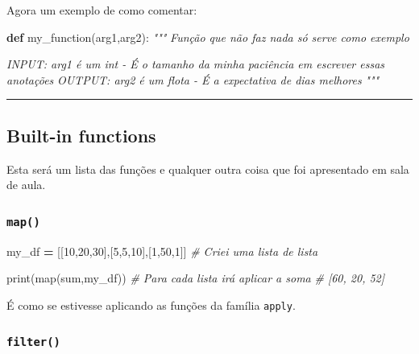 \documentclass[]{book}
\newenvironment{Shaded}{\begin{snugshade}}{\end{snugshade}}
\newcommand{\KeywordTok}[1]{\textcolor[rgb]{0.13,0.29,0.53}{\textbf{#1}}}
\newcommand{\DecValTok}[1]{\textcolor[rgb]{0.00,0.00,0.81}{#1}}
\newcommand{\CommentTok}[1]{\textcolor[rgb]{0.56,0.35,0.01}{\textit{#1}}}
\newcommand{\OperatorTok}[1]{\textcolor[rgb]{0.81,0.36,0.00}{\textbf{#1}}}
\newcommand{\BuiltInTok}[1]{#1}
\newcommand{\NormalTok}[1]{#1}
\begin{document}
Agora um exemplo de como comentar:

\begin{Shaded}
\begin{Highlighting}[]
\KeywordTok{def}\NormalTok{ my_function(arg1,arg2):}
    \CommentTok{"""}
\CommentTok{    Função que não faz nada só serve como exemplo}

\CommentTok{    INPUT: arg1 é um int - É o tamanho da minha paciência em escrever essas anotações}
\CommentTok{    OUTPUT: arg2 é um flota - É a expectativa de dias melhores}
\CommentTok{    """}
\end{Highlighting}
\end{Shaded}

\begin{center}\rule{0.5\linewidth}{\linethickness}\end{center}

\subsection{Built-in functions}\label{built-in-functions-2}

Esta será um lista das funções e qualquer outra coisa que foi
apresentado em sala de aula.

\subsubsection{\texorpdfstring{\texttt{map()}}{map()}}\label{map}

\begin{Shaded}
\begin{Highlighting}[]
\NormalTok{my_df }\OperatorTok{=}\NormalTok{ [[}\DecValTok{10}\NormalTok{,}\DecValTok{20}\NormalTok{,}\DecValTok{30}\NormalTok{],[}\DecValTok{5}\NormalTok{,}\DecValTok{5}\NormalTok{,}\DecValTok{10}\NormalTok{],[}\DecValTok{1}\NormalTok{,}\DecValTok{50}\NormalTok{,}\DecValTok{1}\NormalTok{]] }\CommentTok{# Criei uma lista de lista}

\BuiltInTok{print}\NormalTok{(}\BuiltInTok{map}\NormalTok{(}\BuiltInTok{sum}\NormalTok{,my_df)) }\CommentTok{# Para cada lista irá aplicar a soma}
                      \CommentTok{# [60, 20, 52]}
\end{Highlighting}
\end{Shaded}

É como se estivesse aplicando as funções da família \texttt{apply}.

\subsubsection{\texorpdfstring{\texttt{filter()}}{filter()}}\label{filter}
\end{document}
